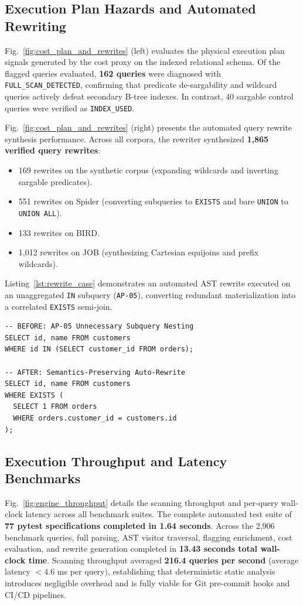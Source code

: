 \documentclass[conference]{IEEEtran}
\begin{document}
\subsection{Execution Plan Hazards and Automated Rewriting}
Fig.~\ref{fig:cost_plan_and_rewrites} (left) evaluates the physical execution plan signals generated by the cost proxy on the indexed relational schema. Of the flagged queries evaluated, \textbf{162 queries} were diagnosed with \texttt{FULL\_SCAN\_DETECTED}, confirming that predicate de-sargability and wildcard queries actively defeat secondary B-tree indexes. In contrast, 40 sargable control queries were verified as \texttt{INDEX\_USED}.

Fig.~\ref{fig:cost_plan_and_rewrites} (right) presents the automated query rewrite synthesis performance. Across all corpora, the rewriter synthesized \textbf{1,865 verified query rewrites}:
\begin{itemize}
    \item 169 rewrites on the synthetic corpus (expanding wildcards and inverting sargable predicates).
    \item 551 rewrites on Spider (converting subqueries to \texttt{EXISTS} and bare \texttt{UNION} to \texttt{UNION ALL}).
    \item 133 rewrites on BIRD.
    \item 1,012 rewrites on JOB (synthesizing Cartesian equijoins and prefix wildcards).
\end{itemize}

Listing~\ref{lst:rewrite_case} demonstrates an automated AST rewrite executed on an unaggregated \texttt{IN} subquery (\texttt{AP-05}), converting redundant materialization into a correlated \texttt{EXISTS} semi-join.

\begin{lstlisting}[language=SQLCustom, caption={Automated AST rewrite transforming an unaggregated subquery (AP-05) into an EXISTS semi-join.}, label={lst:rewrite_case}]
-- BEFORE: AP-05 Unnecessary Subquery Nesting
SELECT id, name FROM customers 
WHERE id IN (SELECT customer_id FROM orders);

-- AFTER: Semantics-Preserving Auto-Rewrite
SELECT id, name FROM customers 
WHERE EXISTS (
  SELECT 1 FROM orders 
  WHERE orders.customer_id = customers.id
);
\end{lstlisting}

\subsection{Execution Throughput and Latency Benchmarks}
Fig.~\ref{fig:engine_throughput} details the scanning throughput and per-query wall-clock latency across all benchmark suites. The complete automated test suite of \textbf{77 pytest specifications completed in 1.64 seconds}. Across the 2,906 benchmark queries, full parsing, AST visitor traversal, flagging enrichment, cost evaluation, and rewrite generation completed in \textbf{13.43 seconds total wall-clock time}. Scanning throughput averaged \textbf{216.4 queries per second} (average latency $<4.6$ ms per query), establishing that deterministic static analysis introduces negligible overhead and is fully viable for Git pre-commit hooks and CI/CD pipelines.
\end{document}
